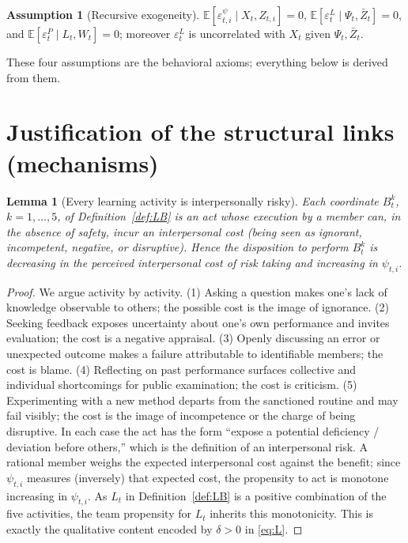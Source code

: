 \documentclass{amsart}
\newtheorem{lemma}{Lemma}
\theoremstyle{definition}
\newtheorem{assumption}{Assumption}
\theoremstyle{remark}
\begin{document}
\begin{assumption}[Recursive exogeneity]\label{ass:exog}
$\mathbb{E}[\varepsilon^{\psi}_{t,i}\mid X_t,Z_{t,i}]=0$,
$\mathbb{E}[\varepsilon^{L}_t\mid \Psi_t,\bar Z_t]=0$, and
$\mathbb{E}[\varepsilon^{P}_t\mid L_t,W_t]=0$; moreover
$\varepsilon^L_t$ is uncorrelated with $X_t$ given $\Psi_t,\bar Z_t$.
\end{assumption}

These four assumptions are the behavioral axioms; everything below is
derived from them.

\section{Justification of the structural links (mechanisms)}

\begin{lemma}[Every learning activity is interpersonally risky]\label{lem:risk}
Each coordinate $B_t^k$, $k=1,\dots,5$, of Definition~\ref{def:LB} is an
act whose execution by a member can, in the absence of safety, incur an
interpersonal cost (being seen as ignorant, incompetent, negative, or
disruptive). Hence the disposition to perform $B_t^k$ is decreasing in the
\emph{perceived} interpersonal cost of risk taking and increasing in
$\psi_{t,i}$.
\end{lemma}

\begin{proof}
We argue activity by activity. (1) Asking a question makes one's lack of
knowledge observable to others; the possible cost is the image of
ignorance. (2) Seeking feedback exposes uncertainty about one's own
performance and invites evaluation; the cost is a negative appraisal. (3)
Openly discussing an error or unexpected outcome makes a failure
attributable to identifiable members; the cost is blame. (4) Reflecting on
past performance surfaces collective and individual shortcomings for
public examination; the cost is criticism. (5) Experimenting with a new
method departs from the sanctioned routine and may fail visibly; the cost
is the image of incompetence or the charge of being disruptive. In each
case the act has the form ``expose a potential deficiency / deviation
before others,'' which is the definition of an interpersonal risk. A
rational member weighs the expected interpersonal cost against the benefit;
since $\psi_{t,i}$ measures (inversely) that expected cost, the propensity
to act is monotone increasing in $\psi_{t,i}$. As $L_t$ in
Definition~\ref{def:LB} is a positive combination of the five activities,
the team propensity for $L_t$ inherits this monotonicity. This is exactly
the qualitative content encoded by $\delta>0$ in \eqref{eq:L}.
\end{proof}
\end{document}

